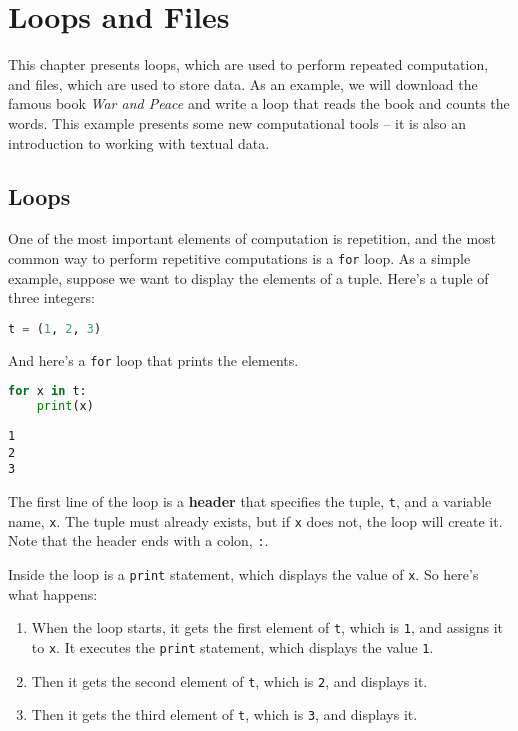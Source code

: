 \chapter{Loops and Files}\label{loops-and-files}

This chapter presents loops, which are used to perform repeated
computation, and files, which are used to store data. As an example, we
will download the famous book \emph{War and Peace} and write a loop that
reads the book and counts the words. This example presents some new
computational tools -- it is also an introduction to working with
textual data.

\section{Loops}\label{loops}

One of the most important elements of computation is repetition, and the
most common way to perform repetitive computations is a
\passthrough{\lstinline!for!} loop. As a simple example, suppose we want
to display the elements of a tuple. Here's a tuple of three integers:

\begin{lstlisting}[language=Python,style=source]
t = (1, 2, 3)
\end{lstlisting}

And here's a \passthrough{\lstinline!for!} loop that prints the
elements.

\begin{lstlisting}[language=Python,style=source]
for x in t:
    print(x)
\end{lstlisting}

\begin{lstlisting}[style=output]
1
2
3
\end{lstlisting}

The first line of the loop is a \textbf{header} that specifies the
tuple, \passthrough{\lstinline!t!}, and a variable name,
\passthrough{\lstinline!x!}. The tuple must already exists, but if
\passthrough{\lstinline!x!} does not, the loop will create it. Note that
the header ends with a colon, \passthrough{\lstinline!:!}.

Inside the loop is a \passthrough{\lstinline!print!} statement, which
displays the value of \passthrough{\lstinline!x!}. So here's what
happens:

\begin{enumerate}
\def\labelenumi{\arabic{enumi}.}
\item
  When the loop starts, it gets the first element of
  \passthrough{\lstinline!t!}, which is \passthrough{\lstinline!1!}, and
  assigns it to \passthrough{\lstinline!x!}. It executes the
  \passthrough{\lstinline!print!} statement, which displays the value
  \passthrough{\lstinline!1!}.
\item
  Then it gets the second element of \passthrough{\lstinline!t!}, which
  is \passthrough{\lstinline!2!}, and displays it.
\item
  Then it gets the third element of \passthrough{\lstinline!t!}, which
  is \passthrough{\lstinline!3!}, and displays it.
\end{enumerate}

